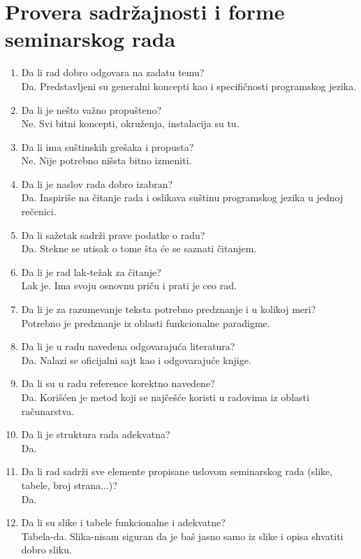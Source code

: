 \documentclass[a4paper]{report}
\begin{document}
\section{Provera sadržajnosti i forme seminarskog rada}

\begin{enumerate}
\item Da li rad dobro odgovara na zadatu temu?\\Da. Predstavljeni su generalni koncepti kao i specifičnosti programskog jezika.
\item Da li je nešto važno propušteno?\\Ne. Svi bitni koncepti, okruženja, instalacija su tu.
\item Da li ima suštinskih grešaka i propusta?\\Ne. Nije potrebno nišsta bitno izmeniti.
\item Da li je naslov rada dobro izabran?\\Da. Inspiriše na čitanje rada i oslikava suštinu programskog jezika u jednoj rečenici.
\item Da li sažetak sadrži prave podatke o radu?\\ Da. Stekne se utisak o tome šta će se saznati čitanjem.
\item Da li je rad lak-težak za čitanje?\\Lak je. Ima svoju osnovnu priču i prati je ceo rad.
\item Da li je za razumevanje teksta potrebno predznanje i u kolikoj meri?\\Potrebno je predznanje iz oblasti funkcionalne paradigme.
\item Da li je u radu navedena odgovarajuća literatura?\\Da. Nalazi se oficijalni sajt kao i odgovarajuće knjige.
\item Da li su u radu reference korektno navedene?\\Da. Korišćen je metod koji se najčešće koristi u radovima iz oblasti računarstva.
\item Da li je struktura rada adekvatna?\\Da.
\item Da li rad sadrži sve elemente propisane uslovom seminarskog rada (slike, tabele, broj strana...)?\\Da.
\item Da li su slike i tabele funkcionalne i adekvatne?\\Tabela-da. Slika-nisam siguran da je baš jasno samo iz slike i opisa shvatiti dobro sliku.
\end{enumerate}
\end{document}
